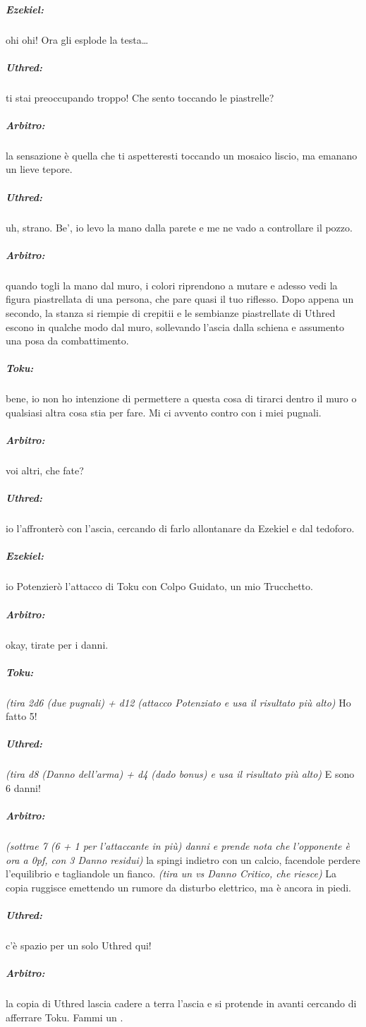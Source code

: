 \documentclass[itdr]{subfiles}
\begin{document}
{\subparagraph{Ezekiel:} ohi ohi! Ora gli esplode la testa\ldots

\subparagraph{Uthred:} ti stai preoccupando troppo! Che sento toccando le piastrelle?

\subparagraph{Arbitro:} la sensazione è quella che ti aspetteresti toccando un mosaico liscio, ma emanano un lieve tepore.

\subparagraph{Uthred:} uh, strano. Be', io levo la mano dalla parete e me ne vado a controllare il pozzo.

\vfill
\break

\subparagraph{Arbitro:} quando togli la mano dal muro, i colori riprendono a mutare e adesso vedi la figura piastrellata di una persona, che pare quasi il tuo riflesso. Dopo appena un secondo, la stanza si riempie di crepitii e le sembianze piastrellate di Uthred escono in qualche modo dal muro, sollevando l'ascia dalla schiena e assumento una posa da combattimento.

\subparagraph{Toku:} bene, io non ho intenzione di permettere a questa cosa di tirarci dentro il muro o qualsiasi altra cosa stia per fare. Mi ci avvento contro con i miei pugnali.

\subparagraph{Arbitro:} voi altri, che fate?

\subparagraph{Uthred:} io l'affronterò con l'ascia, cercando di farlo allontanare da Ezekiel e dal tedoforo.

\subparagraph{Ezekiel:} io Potenzierò l'attacco di Toku con Colpo Guidato, un mio Trucchetto.

\subparagraph{Arbitro:} okay, tirate per i danni.

\subparagraph{Toku:} {\em (tira 2d6 (due pugnali) + d12 (attacco Potenziato e usa il risultato più alto)} Ho fatto 5!

\subparagraph{Uthred:} {\em (tira d8 (Danno dell'arma) + d4 (dado bonus) e usa il risultato più alto)} E sono 6 danni!

\subparagraph{Arbitro:} {\em (sottrae 7 (6 + 1 per l'attaccante in più) danni e prende nota che l'opponente è ora a 0pf, con 3 Danno residui)} la spingi indietro con un calcio, facendole perdere l'equilibrio e tagliandole un fianco. {\em (tira un  vs Danno Critico, che riesce)} La copia ruggisce emettendo un rumore da disturbo elettrico, ma è ancora in piedi.

\subparagraph{Uthred:} c'è spazio per un solo Uthred qui!

\subparagraph{Arbitro:} la copia di Uthred lascia cadere a terra l'ascia e si protende in avanti cercando di afferrare Toku. Fammi un .

}
\end{document}
